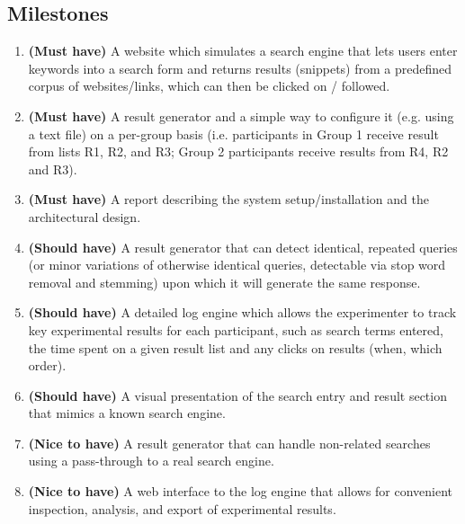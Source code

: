 \documentclass[]{usiinfbachelorproject}
\begin{document}
\subsection{Milestones}
    \begin{enumerate}

        \item \textbf{(Must have)} A website which simulates a search engine that lets users enter keywords into a search form and
              returns results (snippets) from a predefined corpus of websites/links, which can then be clicked on / followed.

        \item \textbf{(Must have)} A result generator and a simple way to configure it (e.g. using a text file) on a per-group
              basis (i.e. participants in Group 1 receive result from lists R1, R2, and R3; Group 2 participants
              receive results from R4, R2 and R3).

        \item \textbf{(Must have)} A report describing the system setup/installation and the architectural design. 

        \item \textbf{(Should have)} A result generator that can detect identical, repeated queries (or minor variations of
              otherwise identical queries, detectable via stop word removal and stemming) upon which it will generate the same response.

        \item \textbf{(Should have)} A detailed log engine which allows the experimenter to track key experimental results
              for each participant, such as search terms entered, the time spent on a given result list and any clicks on
              results (when, which order).

        \item \textbf{(Should have)} A visual presentation of the search entry and result section that mimics a known search engine.  

        \item \textbf{(Nice to have)} A result generator that can handle non-related searches using a pass-through to a real search engine.

        \item \textbf{(Nice to have)} A web interface to the log engine that allows for convenient inspection, analysis,
              and export of experimental results.

    \end{enumerate}
\end{document}
